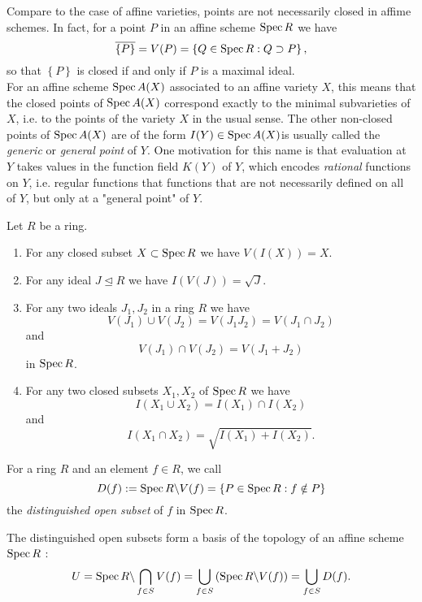 \begin{remark}
  Compare to the case of affine varieties, points are not necessarily closed in affime schemes. In fact, for a point $P$ in an affine scheme $\operatorname{Spec} R$ we have
  \[
    \overline{\left\{P\right\} }=V(P)=\left\{Q\in \operatorname{Spec} R:Q\supset P\right\} ,
  \] 
  so that $\left\{P\right\} $ is closed if and only if $P$ is a maximal ideal.\\
  For an affine scheme $\operatorname{Spec} A(X)$ associated to an affine variety $X$, this means that the closed points of $\operatorname{Spec} A(X)$ correspond exactly to the minimal subvarieties of $X$, i.e. to the points of the variety $X$ in the usual sense. The other non-closed points of $\operatorname{Spec} A(X)$ are of the form $I(Y) \in \operatorname{Spec} A(X)$is usually called the \textit{generic} or \textit{general point} of $Y$. One motivation for this name is that evaluation at $Y$ takes values in the function field $K(Y)$ of $Y$, which encodes \textit{rational} functions on $Y$, i.e. regular functions that functions that are not necessarily defined on all of $Y$, but only at a "general point" of $Y$.
\end{remark}

\begin{proposition}
  Let $R$ be a ring.
  \begin{enumerate}
    \item For any closed subset $X\subset \operatorname{Spec} R$ we have $V\left( I\left( X \right)  \right) =X$.
    \item For any ideal $J\unlhd R$ we have $I\left( V\left( J \right)  \right) =\sqrt{J} $.
    \item For any two ideals $J_1,J_2$ in a ring $R$ we have 
      \[
	V(J_1)\cup V(J_2)=V(J_1J_2)=V(J_1\cap J_2)
      \] and
      \[
	V(J_1)\cap V(J_2)=V(J_1+J_2)
      \] 
      in $\operatorname{Spec} R$.
    \item For any two closed subsets $X_1,X_2$ of $\operatorname{Spec} R$ we have 
      \[
	I(X_1\cup X_2)=I(X_1)\cap I(X_2)
      \] and
      \[
	I(X_1\cap X_2)=\sqrt{I(X_1)+I(X_2)} 
      .\]
  \end{enumerate}
\end{proposition}

\begin{definition}
  For a ring $R$ and an element $f\in R$, we call
  \[
    D(f):=\operatorname{Spec} R \backslash V(f)=\left\{P\in \operatorname{Spec} R:f \notin P\right\} 
  \] the \textit{distinguished open subset } of $f$ in $\operatorname{Spec} R$.
\end{definition}
\begin{remark}
  The distinguished open subsets form a basis of the topology of an affine scheme $\operatorname{Spec} R$ :
  \[
    U=\operatorname{Spec} R\backslash \bigcap_{f\in S} V(f)=\bigcup_{f\in S} \left( \operatorname{Spec} R\backslash  V(f) \right) =\bigcup_{f\in S} D(f).
  \] 
\end{remark}

